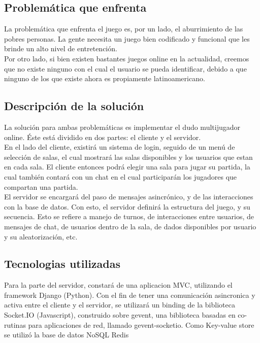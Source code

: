 \documentclass[a4paper,11pt]{article}
\begin{document}
\subsection{Problemática que enfrenta}

	La problemática que enfrenta el juego es, por un lado, el aburrimiento de las pobres personas. La gente necesita un juego bien codificado y funcional
que les brinde un alto nivel de entretención.\\

	Por otro lado, si bien existen bastantes juegos online en la actualidad,
creemos que no existe ninguno con el cual el usuario se pueda identificar,
debido a que ninguno de los que existe ahora es propiamente latinoamericano. 

\subsection{Descripción de la solución}
	
	La solución para ambas problemáticas es implementar el dudo 
multijugador online. Éste está dividido en dos partes: el cliente y el servidor.
\\

	En el lado del cliente, existirá un sistema de login, seguido de un 
menú de selección de salas, el cual mostrará las salas disponibles y los 
usuarios que estan en cada sala. El cliente entonces podrá elegir una sala 
para jugar su partida, la cual también contará con un chat en el cual 
participarán los jugadores que compartan una partida.\\

	El servidor se encargará del paso de mensajes asincrónico, y de las
interacciones con la base de datos. Con esto, el servidor definirá la 
estructura del juego, y su secuencia. Esto se refiere a manejo de turnos, 
de interacciones entre usuarios, de mensajes de chat, de usuarios dentro de 
la sala, de dados disponibles por usuario y su aleatorización, etc.
	

\subsection{Tecnologias utilizadas}
Para la parte del servidor, constará de una aplicacion MVC, utilizando el framework
Django (Python). Con el fin de tener una comunicación asincronica y activa entre
el cliente y el servidor, se utilizará un binding de la biblioteca Socket.IO (Javascript),
construido sobre gevent, una biblioteca basadas en co-rutinas para aplicaciones de red, llamado
gevent-socketio. Como Key-value store se utilizó la base de datos NoSQL Redis\\
\end{document}
